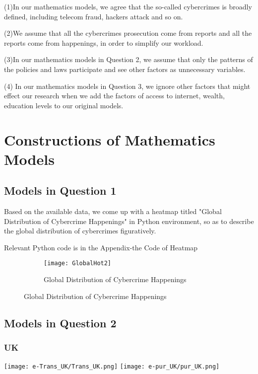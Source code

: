 \documentclass[12pt]{article}
\begin{document}
	(1)In our mathematics models, we agree that the so-called cybercrimes is broadly defined, including telecom fraud, hackers attack and so on.\cite{DefClaCyber}

	(2)We assume that all the cybercrimes prosecution come from reports and all the reports come from happenings, in order to simplify our workload.
	
	(3)In our mathematics models in Question 2, we assume that only the patterns of the policies and laws participate and see other factors as unnecessary variables.

    (4)	In our mathematics models in Question 3, we ignore other factors that might effect our research when we add the factors of access to internet, wealth, education levels to our original models.
	
	\section{Constructions of Mathematics Models}
	
	
	\subsection{Models in Question 1}
	\normalsize 
	
	Based on the available data, we come up with a heatmap titled "Global Distribution of Cybercrime Happenings" in Python environment, so as to describe the global distribution of cybercrimes figuratively.
	
	Relevant Python code is in the Appendix-the Code of Heatmap
	\begin{figure}[H]
		
		\centering
		\begin{subfigure}
			\centering
			\texttt{[image: GlobalHot2]}
			\caption{Global Distribution of Cybercrime Happenings}
			\label{fig:HeatMap}
		\end{subfigure}
		
	\end{figure}
	
	\subsection{Models in Question 2}
	\normalsize 
	\subsubsection{UK}
				\begin{center}
		\texttt{[image: e-Trans\_UK/Trans\_UK.png]}
		\texttt{[image: e-pur\_UK/pur\_UK.png]}
	\end{center}
	
\end{document}
